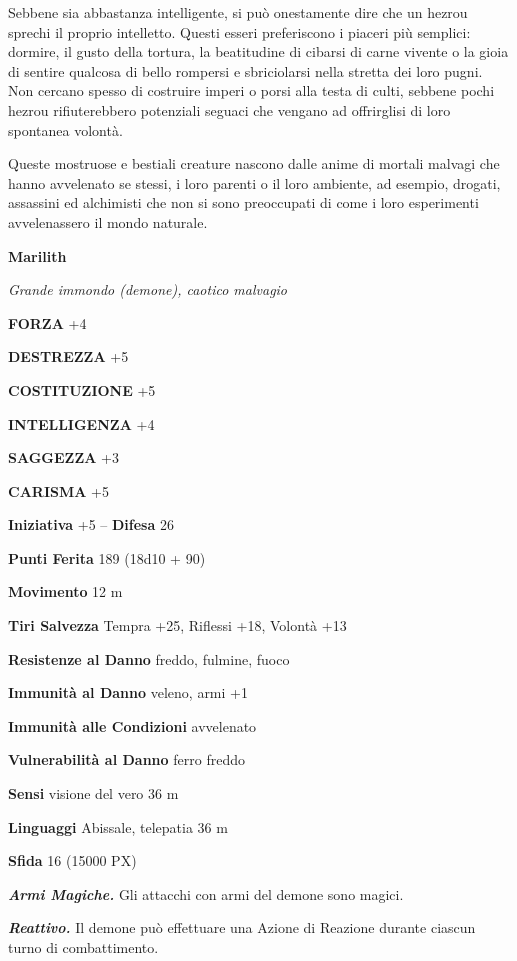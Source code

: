 \begin{multicols}{2}
	Sebbene sia abbastanza intelligente, si può onestamente dire che un hezrou sprechi il proprio intelletto. Questi esseri preferiscono i piaceri più semplici: dormire, il gusto della tortura, la beatitudine di cibarsi di carne vivente o la gioia di sentire qualcosa di bello rompersi e sbriciolarsi nella stretta dei loro pugni. Non cercano spesso di costruire imperi o porsi alla testa di culti, sebbene pochi hezrou rifiuterebbero potenziali seguaci che vengano ad offrirglisi di loro spontanea volontà.

	Queste mostruose e bestiali creature nascono dalle anime di mortali malvagi che hanno avvelenato se stessi, i loro parenti o il loro ambiente, ad esempio, drogati, assassini ed alchimisti che non si sono preoccupati di come i loro esperimenti avvelenassero il mondo naturale.

	\medskip{}\textbf{Marilith}

	\textit{Grande immondo (demone), caotico malvagio}

	\textbf{FORZA} +4

	\textbf{DESTREZZA} +5

	\textbf{COSTITUZIONE} +5

	\textbf{INTELLIGENZA} +4

	\textbf{SAGGEZZA} +3

	\textbf{CARISMA} +5

	\textbf{Iniziativa} +5 -- \textbf{Difesa} 26

	\textbf{Punti Ferita} 189 (18d10 + 90)

	\textbf{Movimento} 12 m

	\textbf{Tiri Salvezza} Tempra +25, Riflessi +18, Volontà +13

	\textbf{Resistenze al Danno} freddo, fulmine, fuoco

	\textbf{Immunità al Danno} veleno, armi +1

	\textbf{Immunità alle Condizioni} avvelenato

	\textbf{Vulnerabilità al Danno} ferro freddo

	\textbf{Sensi} visione del vero 36 m

	\textbf{Linguaggi} Abissale, telepatia 36 m

	\textbf{Sfida} 16 (15000 PX)

	\textit{\textbf{Armi Magiche.}} Gli attacchi con armi del demone sono magici.

	\textit{\textbf{Reattivo.}} Il demone può effettuare una Azione di Reazione durante ciascun turno di combattimento.


\end{multicols}
